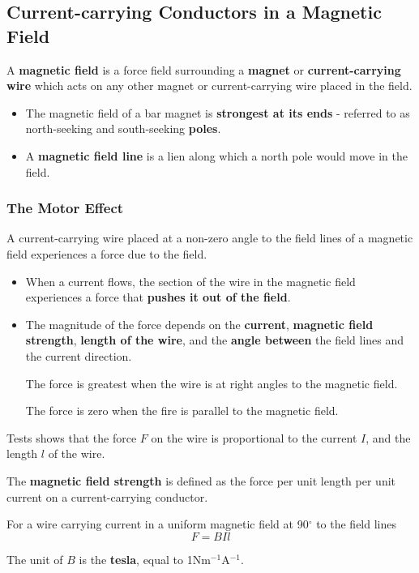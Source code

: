 \subsection{Current-carrying Conductors in a Magnetic Field}

A \textbf{magnetic field} is a force field surrounding a \textbf{magnet} or \textbf{current-carrying wire} which acts on any other magnet or current-carrying wire placed in the field.
\begin{itemize}
    \item The magnetic field of a bar magnet is \textbf{strongest at its ends} - referred to as north-seeking and south-seeking \textbf{poles}.
    \item A \textbf{magnetic field line} is a lien along which a north pole would move in the field.
\end{itemize}

\subsubsection*{The Motor Effect}

A current-carrying wire placed at a non-zero angle to the field lines of a magnetic field experiences a force due to the field.
\begin{itemize}
    \item When a current flows, the section of the wire in the magnetic field experiences a force that \textbf{pushes it out of the field}.
    \item The magnitude of the force depends on the \textbf{current}, \textbf{magnetic field strength}, \textbf{length of the wire}, and the \textbf{angle between} the field lines and the current direction.

        The force is greatest when the wire is at right angles to the magnetic field.

        The force is zero when the fire is parallel to the magnetic field.
\end{itemize}

Tests shows that the force $F$ on the wire is proportional to the current $I$, and the length $l$ of the wire.

The \textbf{magnetic field strength} is defined as the force per unit length per unit current on a current-carrying conductor.

For a wire carrying current in a uniform magnetic field at 90$^\circ$ to the field lines
$$F=BIl$$

The unit of $B$ is the \textbf{tesla}, equal to 1Nm$^{-1}$A$^{-1}$.

